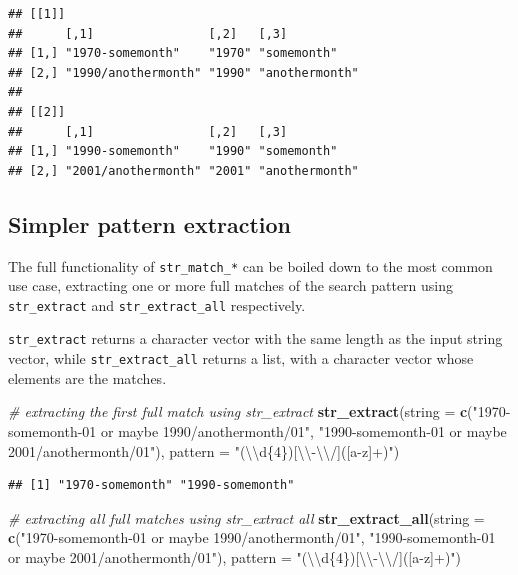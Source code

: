 \documentclass[]{book}
\newenvironment{Shaded}{}{}
\newcommand{\CharTok}[1]{\textcolor[rgb]{0.25,0.44,0.63}{#1}}
\newcommand{\CommentTok}[1]{\textcolor[rgb]{0.38,0.63,0.69}{\textit{#1}}}
\newcommand{\DataTypeTok}[1]{\textcolor[rgb]{0.56,0.13,0.00}{#1}}
\newcommand{\KeywordTok}[1]{\textcolor[rgb]{0.00,0.44,0.13}{\textbf{#1}}}
\newcommand{\NormalTok}[1]{#1}
\newcommand{\StringTok}[1]{\textcolor[rgb]{0.25,0.44,0.63}{#1}}
\begin{document}
\begin{verbatim}
## [[1]]
##      [,1]                [,2]   [,3]          
## [1,] "1970-somemonth"    "1970" "somemonth"   
## [2,] "1990/anothermonth" "1990" "anothermonth"
## 
## [[2]]
##      [,1]                [,2]   [,3]          
## [1,] "1990-somemonth"    "1990" "somemonth"   
## [2,] "2001/anothermonth" "2001" "anothermonth"
\end{verbatim}

\hypertarget{simpler-pattern-extraction}{%
\subsection{Simpler pattern extraction}\label{simpler-pattern-extraction}}

The full functionality of \texttt{str\_match\_*} can be boiled down to the most common use case, extracting one or more full matches of the search pattern using \texttt{str\_extract} and \texttt{str\_extract\_all} respectively.

\texttt{str\_extract} returns a character vector with the same length as the input string vector, while \texttt{str\_extract\_all} returns a list, with a character vector whose elements are the matches.

\begin{Shaded}
\begin{Highlighting}[]
\CommentTok{# extracting the first full match using str_extract}
\KeywordTok{str_extract}\NormalTok{(}\DataTypeTok{string =} \KeywordTok{c}\NormalTok{(}\StringTok{"1970-somemonth-01 or maybe 1990/anothermonth/01"}\NormalTok{,}
                       \StringTok{"1990-somemonth-01 or maybe 2001/anothermonth/01"}\NormalTok{),}
            \DataTypeTok{pattern =} \StringTok{"(}\CharTok{\textbackslash{}\textbackslash{}}\StringTok{d\{4\})[}\CharTok{\textbackslash{}\textbackslash{}}\StringTok{-}\CharTok{\textbackslash{}\textbackslash{}}\StringTok{/]([a-z]+)"}\NormalTok{)}
\end{Highlighting}
\end{Shaded}

\begin{verbatim}
## [1] "1970-somemonth" "1990-somemonth"
\end{verbatim}

\begin{Shaded}
\begin{Highlighting}[]
\CommentTok{# extracting all full matches using str_extract all}
\KeywordTok{str_extract_all}\NormalTok{(}\DataTypeTok{string =} \KeywordTok{c}\NormalTok{(}\StringTok{"1970-somemonth-01 or maybe 1990/anothermonth/01"}\NormalTok{,}
                           \StringTok{"1990-somemonth-01 or maybe 2001/anothermonth/01"}\NormalTok{),}
                \DataTypeTok{pattern =} \StringTok{"(}\CharTok{\textbackslash{}\textbackslash{}}\StringTok{d\{4\})[}\CharTok{\textbackslash{}\textbackslash{}}\StringTok{-}\CharTok{\textbackslash{}\textbackslash{}}\StringTok{/]([a-z]+)"}\NormalTok{)}
\end{Highlighting}
\end{Shaded}
\end{document}
